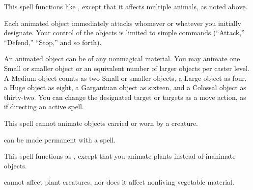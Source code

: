 \spellrng{\rngmed}
\begin{spelleffect}
  This spell functions like , except that it affects multiple animals, as noted above.
\end{spelleffect}

\spellrng{\rngmed}
\spelldur{\durshort}
\begin{spelleffect}
  Each animated object immediately attacks whomever or whatever you initially designate. Your control of the objects is limited to simple commands (``Attack,'' ``Defend,'' ``Stop,'' and so forth).
  \par An animated object can be of any nonmagical material. You may animate one Small or smaller object or an equivalent number of larger objects per caster level. A Medium object counts as two Small or smaller objects, a Large object as four, a Huge object as eight, a Gargantuan object as sixteen, and a Colossal object as thirty-two. You can change the designated target or targets as a move action, as if directing an active spell.
\end{spelleffect}
\begin{spellnotes}
  This spell cannot animate objects carried or worn by a creature.
  \par {} can be made permanent with a  spell.
\end{spellnotes}

\begin{spelleffect}
  This spell functions as , except that you animate plants instead of inanimate objects.
\end{spelleffect}
\begin{spellnotes}
   cannot affect plant creatures, nor does it affect nonliving vegetable material.
\end{spellnotes}

